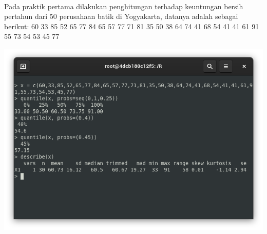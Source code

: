 \documentclass[a4paper,12pt]{article}
\begin{document}
\paragraph{}
Pada praktik pertama dilakukan penghitungan terhadap keuntungan bersih pertahun dari 50 perusahaan batik di Yogyakarta, datanya adalah sebagai berikut: 60 33 85 52 65 77 84 65 57 77 71 81 35 50 38 64 74 41 68 54 41 41 61 91 55 73 54 53 45 77
\begin{center}
	\includegraphics[scale=.5]{1}
\end{center}
\end{document}
